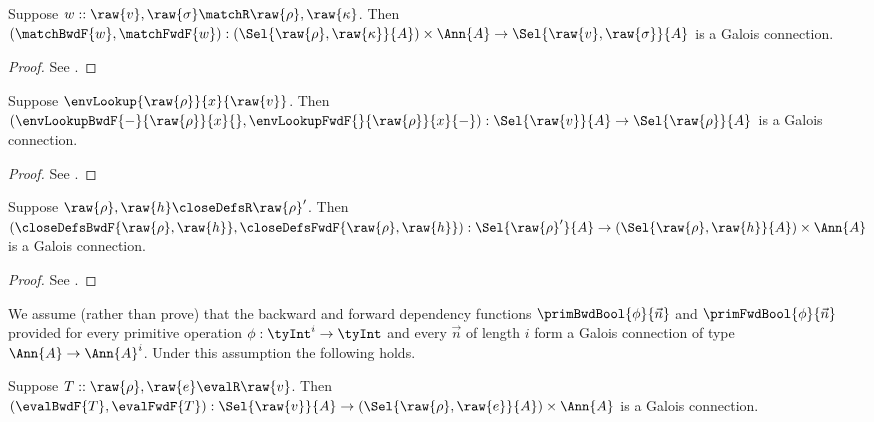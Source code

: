 \begin{theorem}
   \label{thm:core-language:match:gc}
   Suppose $w :: \raw{v}, \raw{\sigma} \matchR \raw{\rho}, \raw{\kappa}$.  Then $(\matchBwdF{w}, \matchFwdF{w}): (\Sel{\raw{\rho},\raw{\kappa}}{A}) \times \Ann{A} \to \Sel{\raw{v}, \raw{\sigma}}{A}$ is a Galois connection.
\end{theorem}

\begin{proof}
\ifappendices See . \else \ProofInSupplementaryMaterial \fi
\end{proof}

\begin{lemma}
   \label{lem:core-language:env-get-put}
   Suppose $\envLookup{\raw{\rho}}{x}{\raw{v}}$. Then $(\envLookupBwdF{-}{\raw{\rho}}{x}{},\envLookupFwdF{}{\raw{\rho}}{x}{-}): \Sel{\raw{v}}{A} \to \Sel{\raw{\rho}}{A}$ is a Galois connection.
\end{lemma}

\begin{proof}
   \ifappendices See . \else \ProofInSupplementaryMaterial \fi
   \end{proof}

   \begin{theorem}
\label{thm:core-language:closeDefs:gc}
   Suppose $\raw{\rho}, \raw{h} \closeDefsR \raw{\rho}'$. Then $({\closeDefsBwdF{\raw{\rho},\raw{h}}, \closeDefsFwdF{\raw{\rho}, \raw{h}}}): \Sel{\raw{\rho}'}{A} \to (\Sel{\raw{\rho},\raw{h}}{A}) \times \Ann{A}$ is a Galois connection.
\end{theorem}

\begin{proof}
   \ifappendices See . \else \ProofInSupplementaryMaterial \fi
   \end{proof}

We assume (rather than prove) that the backward and forward dependency functions $\primBwdBool{\phi}{\vec{n}}$ and $\primFwdBool{\phi}{\vec{n}}$ provided for every primitive operation $\phi: \tyInt^i \to \tyInt$ and every $\vec{n}$ of length $i$ form a Galois connection of type $\Ann{A} \to \Ann{A}^i$. Under this assumption the following holds.

\begin{theorem}
\label{thm:core-language:eval:gc}
   Suppose $T :: \raw{\rho}, \raw{e} \evalR \raw{v}$.  Then $(\evalBwdF{T}, \evalFwdF{T}): \Sel{\raw{v}}{A} \to (\Sel{\raw{\rho}, \raw{e}}{A}) \times \Ann{A}$ is a Galois connection.
\end{theorem}

